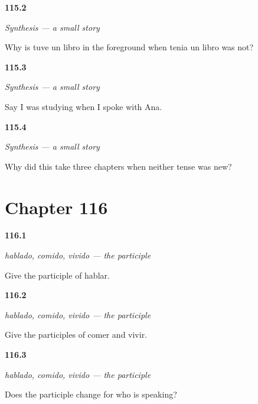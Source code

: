 \noindent\begin{minipage}[t]{\linewidth}
\raggedright
\hypertarget{review-ES-C48-sintesis-una-historia-third}{\textbf{115.2}} \emph{Synthesis — a small story}\par
\small Why is tuve un libro in the foreground when tenia un libro was not?
\end{minipage}\par\medskip

\noindent\begin{minipage}[t]{\linewidth}
\raggedright
\hypertarget{review-ES-C48-sintesis-una-historia-tell}{\textbf{115.3}} \emph{Synthesis — a small story}\par
\small Say I was studying when I spoke with Ana.
\end{minipage}\par\medskip

\noindent\begin{minipage}[t]{\linewidth}
\raggedright
\hypertarget{review-ES-C48-sintesis-una-historia-why}{\textbf{115.4}} \emph{Synthesis — a small story}\par
\small Why did this take three chapters when neither tense was new?
\end{minipage}\par\medskip

\section*{Chapter 116}

\noindent\begin{minipage}[t]{\linewidth}
\raggedright
\hypertarget{review-ES-C49-participio-ar}{\textbf{116.1}} \emph{hablado, comido, vivido — the participle}\par
\small Give the participle of hablar.
\end{minipage}\par\medskip

\noindent\begin{minipage}[t]{\linewidth}
\raggedright
\hypertarget{review-ES-C49-participio-erir}{\textbf{116.2}} \emph{hablado, comido, vivido — the participle}\par
\small Give the participles of comer and vivir.
\end{minipage}\par\medskip

\noindent\begin{minipage}[t]{\linewidth}
\raggedright
\hypertarget{review-ES-C49-participio-person}{\textbf{116.3}} \emph{hablado, comido, vivido — the participle}\par
\small Does the participle change for who is speaking?
\end{minipage}\par\medskip

